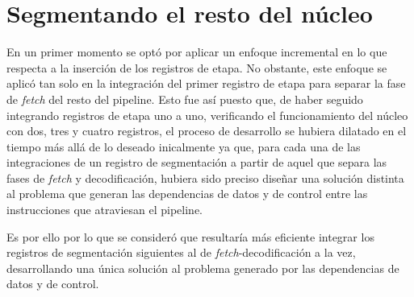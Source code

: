 

\section{Segmentando el resto del núcleo}

En un primer momento se optó por aplicar un enfoque incremental en lo que respecta a la inserción de los registros de etapa. No obstante, este enfoque se aplicó tan solo en la integración del primer registro de etapa para separar la fase de \textit{fetch} del resto del pipeline. Esto fue así puesto que, de haber seguido integrando registros de etapa uno a uno, verificando el funcionamiento del núcleo con dos, tres y cuatro registros, el proceso de desarrollo se hubiera dilatado en el tiempo más allá de lo deseado inicalmente ya que, para cada una de las integraciones de un registro de segmentación a partir de aquel que separa las fases de \textit{fetch} y decodificación, hubiera sido preciso diseñar una solución distinta al problema que generan las dependencias de datos y de control entre las instrucciones que atraviesan el pipeline.

Es por ello por lo que se consideró que resultaría más eficiente integrar los registros de segmentación siguientes al de \textit{fetch}-decodificación a la vez, desarrollando una única solución al problema generado por las dependencias de datos y de control.
